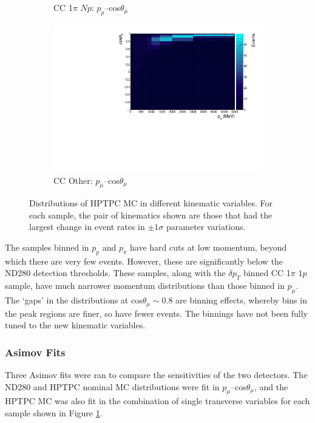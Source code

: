 \begin{figure}
\begin{subfigure}{.49\textwidth}
  \caption{CC 1$\pi$ $Np$: $p_{p}$--cos$\theta_{\mu}$}
\end{subfigure}
\begin{subfigure}{.49\textwidth}
  \centering
  \includegraphics[width=0.9\linewidth]{figs/hptpc_sigvar_ccOther.pdf}
  \caption{CC Other: $p_{\mu}$--cos$\theta_{\mu}$}
\end{subfigure}
\caption{Distributions of HPTPC MC in different kinematic variables. For each sample, the pair of kinematics shown are those that had the largest change in event rates in $\pm1\sigma$ parameter variations.}
\label{fig:hptpcsigvar}
\end{figure}

The samples binned in $p_{p}$ and $p_{\pi}$ have hard cuts at low momentum, beyond which there are very few events. However, these are significantly below the ND280 detection thresholds. These samples, along with the $\delta p_{T}$ binned CC 1$\pi$ $1p$  sample, have much narrower momentum distributions than those binned in $p_{\mu}$. The `gaps' in the distributions at cos$\theta_{\mu}\sim$0.8 are binning effects, whereby bins in the peak regions are finer, so have fewer events. The binnings have not been fully tuned to the new kinematic variables. 

\subsubsection{Asimov Fits}

Three Asimov fits were ran to compare the sensitivities of the two detectors. The ND280 and HPTPC nominal MC distributions were fit in $p_{\mu}$--cos$\theta_{\mu}$, and the HPTPC MC was also fit in the combination of single transverse variables for each sample shown in Figure \ref{fig:hptpcsigvar}.

